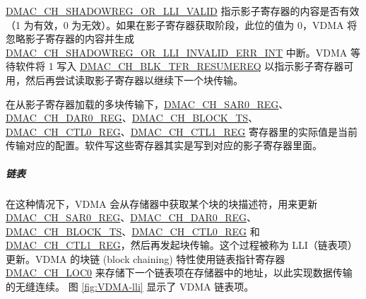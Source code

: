 \documentclass[main\_\_CN.tex]{subfiles}
\begin{document}
\hyperref[fielddesc:DMACCHNSHADOWREGORLLIVALID]{DMAC\_CH\_SHADOWREG\_OR\_LLI\_VALID} 指示影子寄存器的内容是否有效（1 为有效，0 为无效）。如果在影子寄存器获取阶段，此位的值为 0，VDMA 将忽略影子寄存器的内容并生成 \hyperref[int:DMACCHNSHADOWREGORLLIINVALIDERRINT]{DMAC\_CH\_SHADOWREG\_OR\_LLI\_INVALID\_ERR\_INT} 中断。VDMA 等待软件将 1 写入 \hyperref[fielddesc:DMACCHNBLKTFRRESUMEREQ]{DMAC\_CH\_BLK\_TFR\_RESUMEREQ} 以指示影子寄存器可用，然后再尝试读取影子寄存器以继续下一个块传输。
\begin{tiplisting}
    在从影子寄存器加载的多块传输下，\hyperref[regdesc:DMACCHNSAR0REG]{DMAC\_CH\_SAR0\_REG}、\hyperref[regdesc:DMACCHNDAR0REG]{DMAC\_CH\_DAR0\_REG}、\hyperref[fielddesc:DMACCHNBLOCKTS]{DMAC\_CH\_BLOCK\_TS}、\\\hyperref[regdesc:DMACCHNCTL0REG]{DMAC\_CH\_CTL0\_REG}、\hyperref[regdesc:DMACCHNCTL1REG]{DMAC\_CH\_CTL1\_REG} 寄存器里的实际值是当前传输对应的配置。软件写这些寄存器其实是写到对应的影子寄存器里面。
\end{tiplisting}

\subparagraph{链表}

在这种情况下，VDMA 会从存储器中获取某个块的块描述符，用来更新 \hyperref[regdesc:DMACCHNSAR0REG]{DMAC\_CH\_SAR0\_REG}、\hyperref[regdesc:DMACCHNDAR0REG]{DMAC\_CH\_DAR0\_REG}、\hyperref[fielddesc:DMACCHNBLOCKTS]{DMAC\_CH\_BLOCK\_TS}、\hyperref[regdesc:DMACCHNCTL0REG]{DMAC\_CH\_CTL0\_REG} 和 \hyperref[regdesc:DMACCHNCTL1REG]{DMAC\_CH\_CTL1\_REG}，然后再发起块传输。这个过程被称为 LLI（链表项）更新。VDMA 的块链 (block chaining) 特性使用链表指针寄存器 \hyperref[fielddesc:DMACCHNLOC0]{DMAC\_CH\_LOC0} 来存储下一个链表项在存储器中的地址，以此实现数据传输的无缝连续。
图 \ref{fig:VDMA-lli} 显示了 VDMA 链表项。
\end{document}
